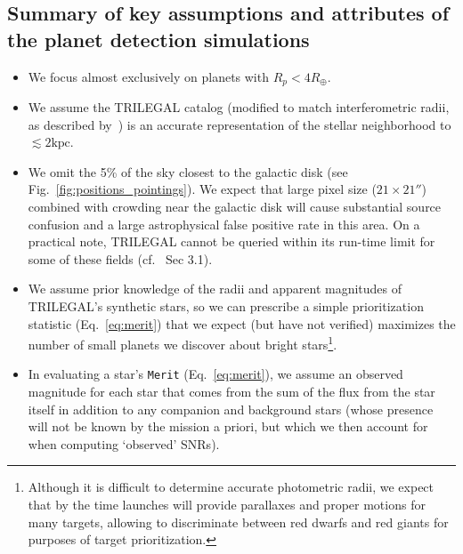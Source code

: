 \subsection{Summary of key assumptions and attributes of the planet detection simulations}
\label{sec:input_assumptions}
\begin{itemize}
  
	\item We focus almost exclusively on planets with $R_p < 4R_\oplus$.

        \item We assume the TRILEGAL catalog (modified to match
          interferometric radii, as described
          by~) is an accurate representation
          of the stellar neighborhood to $\lesssim2\text{kpc}$.

        \item We omit the 5\% of the sky closest to the galactic disk
          (see Fig.~\ref{fig:positions_pointings}). We expect that
          \tesss large pixel size ($21\times21''$) combined with
          crowding near the galactic disk will cause substantial
          source confusion and a large astrophysical false positive
          rate in this area.  On a practical note, TRILEGAL cannot be
          queried within its run-time limit for some of these fields
          (cf.~ Sec 3.1).
        
	\item We assume prior knowledge of the radii and apparent
          magnitudes of TRILEGAL's synthetic stars, so we can
          prescribe a simple prioritization statistic
          (Eq.~\ref{eq:merit}) that we expect (but have not verified)
          maximizes the number of small planets we discover about
          bright stars\footnote{Although it is difficult to determine
            accurate photometric radii, we expect that by the time
            \tess launches \gaia will provide parallaxes and proper
            motions for many \tess targets, allowing \tess to
            discriminate between red dwarfs and red giants for
            purposes of target prioritization.}.
          
	\item In evaluating a star's \texttt{Merit}
          (Eq.~\ref{eq:merit}), we assume an observed magnitude for
          each star that comes from the sum of the flux from the star
          itself in addition to any companion and background stars
          (whose presence will not be known by the mission a priori,
          but which we then account for when computing `observed'
          SNRs).
          

\end{itemize}
